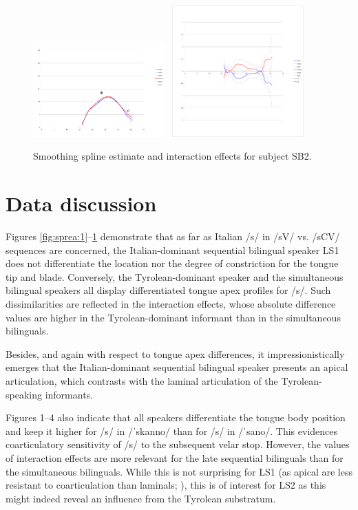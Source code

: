 \documentclass[output=paper]{LSP/langsci}
\begin{document}
\begin{figure}
\includegraphics[width=0.45\textwidth]{illustrations/sprea_fig4a}~
\includegraphics[width=0.45\textwidth,trim=4 42 4 12,clip]{illustrations/sprea_fig4b}
\caption{Smoothing spline estimate and interaction effects for subject SB2.}
\label{fig:sprea:4}   
\end{figure}

\section{Data discussion}
Figures \ref{fig:sprea:1}--\ref{fig:sprea:4} demonstrate that as far as Italian /s/ in /sV/ vs. /sCV/ sequences are concerned, the Italian-dominant sequential bilingual speaker LS1 does not differentiate the location nor the degree of constriction for the tongue tip and blade. Conversely, the Tyrolean-dominant speaker and the simultaneous bilingual speakers all display differentiated tongue apex profiles for /s/. Such dissimilarities are reflected in the interaction effects, whose absolute difference values are higher in the Tyrolean-dominant informant than in the simultaneous bilinguals.

Besides, and again with respect to tongue apex differences, it impressionistically emerges that the Italian-dominant sequential bilingual speaker presents an apical articulation, which contrasts with the laminal articulation of the Tyrolean-speaking informants.

Figures 1--4 also indicate that all speakers differentiate the tongue body position and keep it higher for /s/ in /ˈskanno/ than for /s/ in /ˈsano/. This evidences coarticulatory sensitivity of /s/ to the subsequent velar stop. However, the values of interaction effects are more relevant for the late sequential bilinguals than for the simultaneous bilinguals. While this is not surprising for LS1 (as apical  are less resistant to coarticulation than laminals; \citealt{hardcastle_lingual_1999}), this is of interest for LS2 as this might indeed reveal an influence from the Tyrolean substratum.
\end{document}
